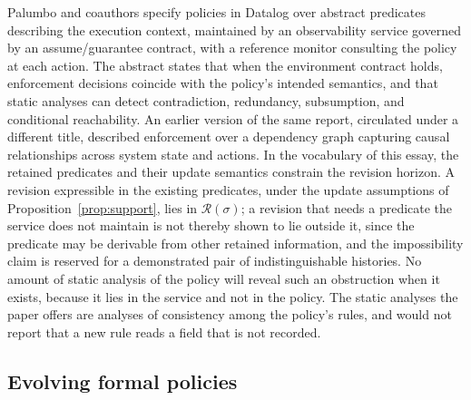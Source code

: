 \documentclass[11pt]{article}
\theoremstyle{definition}
\theoremstyle{remark}
\newcommand{\Hor}{\mathcal{R}}
\begin{document}
Palumbo and coauthors \cite{fpe} specify policies in Datalog over abstract predicates describing the execution context, maintained by an observability service governed by an assume/guarantee contract, with a reference monitor consulting the policy at each action. The abstract states that when the environment contract holds, enforcement decisions coincide with the policy's intended semantics, and that static analyses can detect contradiction, redundancy, subsumption, and conditional reachability. An earlier version of the same report, circulated under a different title, described enforcement over a dependency graph capturing causal relationships across system state and actions. In the vocabulary of this essay, the retained predicates and their update semantics constrain the revision horizon. A revision expressible in the existing predicates, under the update assumptions of Proposition~\ref{prop:support}, lies in $\Hor(\sigma)$; a revision that needs a predicate the service does not maintain is not thereby shown to lie outside it, since the predicate may be derivable from other retained information, and the impossibility claim is reserved for a demonstrated pair of indistinguishable histories. No amount of static analysis of the policy will reveal such an obstruction when it exists, because it lies in the service and not in the policy. The static analyses the paper offers are analyses of consistency among the policy's rules, and would not report that a new rule reads a field that is not recorded.

\subsection{Evolving formal policies}
\end{document}
